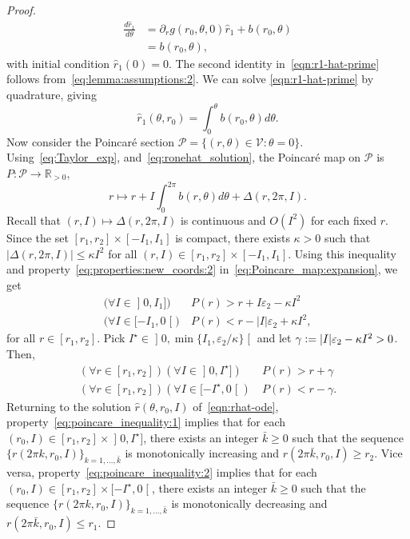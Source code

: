 \documentclass[journal,twoside,web, twocolumn,draftcls]{ieeecolor}
\renewcommand*{\Re}{\mathbb{R}}
\newcommand*{\cV}{\mathcal{V}}
\newcommand*{\cP}{\mathcal{P}}
\newcommand*{\eqdef}{\vcentcolon=}
\begin{document}
\begin{proof}
    \begin{equation}\label{eqn:r1-hat-prime}
\begin{aligned}         
\frac{d \hat{r}_1}{d \theta}&=
        \partial_{r} g(r_0,\theta,0)\hat{r}_1 +
        b(r_0,\theta) \\
&=b(r_0,\theta),
\end{aligned}
     \end{equation}
with initial condition $\hat r_1(0)=0$. The second identity in~\eqref{eqn:r1-hat-prime} follows from~\eqref{eq:lemma:assumptions:2}. We can solve \eqref{eqn:r1-hat-prime} by quadrature, giving
\begin{equation}
\label{eq:ronehat_solution}
\hat{r}_1(\theta,r_0) = \int_0^\theta b(r_0,\theta)d\theta.
\end{equation}
Now consider the Poincar\'e section $\cP = \{(r,\theta) \in \cV: \theta =0\}$. Using~\eqref{eq:Taylor_exp},
and~\eqref{eq:ronehat_solution}, the Poincar\'e map on $\cP$ is $P: \cP \to
\Re_{>0}$, 
\begin{equation}\label{eq:Poincare_map:expansion}
r \mapsto r + I \int_0^{2\pi} b(r,\theta) d \theta + \Delta(r,2 \pi,I).
\end{equation}
Recall that $(r,I) \mapsto \Delta(r,2 \pi,I)$ is continuous and $O(I^2)$ for each fixed $r$. Since the set $[r_1,r_2] \times [-I_1,I_1]$ is compact, there exists $\kappa>0$ such that $| \Delta(r,2\pi,I)| \leq \kappa I^2$ for all  $(r,I) \in [r_1,r_2] \times [-I_1,I_1]$. 
Using this inequality and property~\eqref{eq:properties:new_coords:2} in~\eqref{eq:Poincare_map:expansion}, we get
\[
\begin{aligned}
\big(\forall I \in \mathopen]0,I_1]\big) & \ P(r) > r + I \varepsilon_2 - \kappa I^2 \\
\big(\forall I \in [-I_1,0\mathclose[\big) & \ P(r) < r - |I| \varepsilon_2 + \kappa I^2,
\end{aligned}
\]
for all $r \in [r_1,r_2]$. Pick $I^\star \in \mathopen]0, \min\{I_1, \varepsilon_2/\kappa\} \mathclose[$ and let $\gamma \eqdef |I|\varepsilon_2 - \kappa I^2>0$. Then, 
\begin{subequations}\label{eq:poincare_inequality}
\begin{align}
(\forall r \in [r_1,r_2]) (\forall I \in \mathopen]0,I^\star]) & \ P(r) > r + \gamma \label{eq:poincare_inequality:1}\\
(\forall r \in [r_1,r_2]) (\forall I \in [-I^\star,0\mathclose[) & \ P(r) < r - \gamma. \label{eq:poincare_inequality:2}
\end{align}
\end{subequations}
Returning to the solution $\hat r(\theta,r_0,I)$ of~\eqref{eqn:rhat-ode}, property~\eqref{eq:poincare_inequality:1} implies that for each $(r_0,I) \in [r_1,r_2] \times \mathopen]0,I^\star]$, there exists an integer $\bar k \geq 0$ such that the sequence $\{r(2 \pi k, r_0,I)\}_{k =1,\ldots,\bar k}$ is monotonically increasing and $r(2 \pi \bar k,r_0,I) \geq r_2$. Vice versa, property~\eqref{eq:poincare_inequality:2} implies that for each $(r_0,I) \in [r_1,r_2] \times [-I^\star,0\mathclose[$, there exists an integer $\bar k \geq 0$ such that the sequence $\{r(2 \pi k, r_0,I)\}_{k =1,\ldots,\bar k}$ is monotonically decreasing and $r(2 \pi \bar k,r_0,I) \leq r_1$.


\end{proof}
\end{document}
